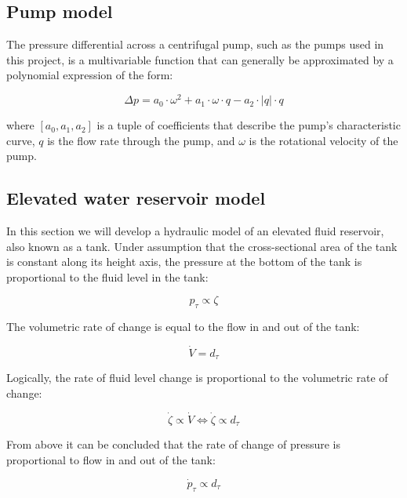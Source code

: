 \subsection{Pump model}\label{subsec:PumpModel}

The pressure differential across a centrifugal pump, such as the pumps used in this project, is a multivariable function that can generally be approximated by a polynomial expression of the form:

\begin{equation}\label{eq:PumpPressure}
	\Delta p =   a_0\cdot \omega^2 +  a_1\cdot \omega \cdot q -a_2\cdot |q|\cdot q
\end{equation}

where $[a_0,a_1,a_2]$ is a tuple of coefficients that describe the pump's characteristic curve, $q$ is the flow rate through the pump, and $\omega$ is the rotational velocity of the pump.

\subsection{Elevated water reservoir model}

In this section we will develop a hydraulic model of an elevated fluid reservoir, also known as a tank.
Under assumption that the cross-sectional area of the tank is constant along its height axis, the pressure at the bottom of the tank is proportional to the fluid level in the tank:

\begin{equation} \label{eq:p prop zeta}
	p_\tau \propto \zeta
\end{equation}

The volumetric rate of change is equal to the flow in and out of the tank:

\begin{equation} \label{eq:vdot = dt}
	\dot{V} = d_\tau
\end{equation}

Logically, the rate of fluid level change is proportional to the volumetric rate of change:  
 
 \begin{equation} \label{eq:zeta prop dt}
	\dot{\zeta} \propto \dot{V} \Leftrightarrow \dot{\zeta} \propto d_\tau
\end{equation} 

From above it can be concluded that the rate of change of pressure is proportional to flow in and out of the tank:

\begin{equation} \label{eq:dotp prop dt}
	\dot{p}_{\tau} \propto d_\tau 
\end{equation}

